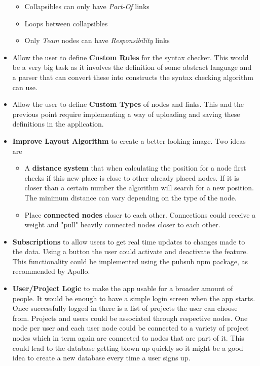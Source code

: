 \begin{itemize}
\begin{itemize}
\item Collapsibles can only have \emph{Part-Of} links
\item Loops between collapsibles
\item Only \emph{Team} nodes can have \emph{Responsibility} links
\end{itemize}

\item Allow the user to define \textbf{Custom Rules} for the syntax checker. This would be a very big task as it involves the definition of some abstract language and a parser that can convert these into constructs the syntax checking algorithm can use.

\item Allow the user to define \textbf{Custom Types} of nodes and links. This and the previous point require implementing a way of uploading and saving these definitions in the application.

\newpage
\item \textbf{Improve Layout Algorithm} to create a better looking image. Two ideas are
\begin{itemize}
\item A \textbf{distance system} that when calculating the position for a node first checks if this new place is close to other already placed nodes. If it is closer than a certain number the algorithm will search for a new position. The minimum distance can vary depending on the type of the node.
\item Place \textbf{connected nodes} closer to each other. Connections could receive a weight and "pull" heavily connected nodes closer to each other.
\end{itemize}

\item \textbf{Subscriptions} to allow users to get real time updates to changes made to the data. Using a button the user could activate and deactivate the feature. This functionality could be implemented using the pubsub npm package, as recommended by Apollo.

\item \textbf{User/Project Logic} to make the app usable for a broader amount of people. It would be enough to have a simple login screen when the app starts. Once successfully logged in there is a list of projects the user can choose from. Projects and users could be associated through respective nodes. One node per user and each user node could be connected to a variety of project nodes which in term again are connected to nodes that are part of it. This could lead to the database getting blown up quickly so it might be a good idea to create a new database every time a user signs up.


\end{itemize}
